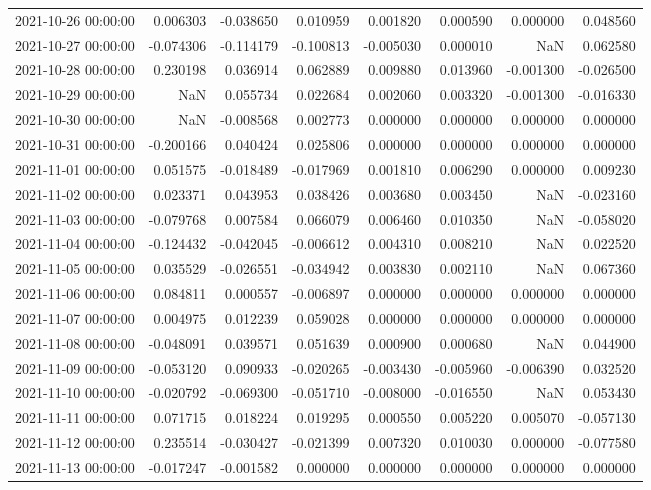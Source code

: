 \begin{tabular}{lrrrrrrr}
2021-10-26 00:00:00 & 0.006303 & -0.038650 & 0.010959 & 0.001820 & 0.000590 & 0.000000 & 0.048560 \\
2021-10-27 00:00:00 & -0.074306 & -0.114179 & -0.100813 & -0.005030 & 0.000010 & NaN & 0.062580 \\
2021-10-28 00:00:00 & 0.230198 & 0.036914 & 0.062889 & 0.009880 & 0.013960 & -0.001300 & -0.026500 \\
2021-10-29 00:00:00 & NaN & 0.055734 & 0.022684 & 0.002060 & 0.003320 & -0.001300 & -0.016330 \\
2021-10-30 00:00:00 & NaN & -0.008568 & 0.002773 & 0.000000 & 0.000000 & 0.000000 & 0.000000 \\
2021-10-31 00:00:00 & -0.200166 & 0.040424 & 0.025806 & 0.000000 & 0.000000 & 0.000000 & 0.000000 \\
2021-11-01 00:00:00 & 0.051575 & -0.018489 & -0.017969 & 0.001810 & 0.006290 & 0.000000 & 0.009230 \\
2021-11-02 00:00:00 & 0.023371 & 0.043953 & 0.038426 & 0.003680 & 0.003450 & NaN & -0.023160 \\
2021-11-03 00:00:00 & -0.079768 & 0.007584 & 0.066079 & 0.006460 & 0.010350 & NaN & -0.058020 \\
2021-11-04 00:00:00 & -0.124432 & -0.042045 & -0.006612 & 0.004310 & 0.008210 & NaN & 0.022520 \\
2021-11-05 00:00:00 & 0.035529 & -0.026551 & -0.034942 & 0.003830 & 0.002110 & NaN & 0.067360 \\
2021-11-06 00:00:00 & 0.084811 & 0.000557 & -0.006897 & 0.000000 & 0.000000 & 0.000000 & 0.000000 \\
2021-11-07 00:00:00 & 0.004975 & 0.012239 & 0.059028 & 0.000000 & 0.000000 & 0.000000 & 0.000000 \\
2021-11-08 00:00:00 & -0.048091 & 0.039571 & 0.051639 & 0.000900 & 0.000680 & NaN & 0.044900 \\
2021-11-09 00:00:00 & -0.053120 & 0.090933 & -0.020265 & -0.003430 & -0.005960 & -0.006390 & 0.032520 \\
2021-11-10 00:00:00 & -0.020792 & -0.069300 & -0.051710 & -0.008000 & -0.016550 & NaN & 0.053430 \\
2021-11-11 00:00:00 & 0.071715 & 0.018224 & 0.019295 & 0.000550 & 0.005220 & 0.005070 & -0.057130 \\
2021-11-12 00:00:00 & 0.235514 & -0.030427 & -0.021399 & 0.007320 & 0.010030 & 0.000000 & -0.077580 \\
2021-11-13 00:00:00 & -0.017247 & -0.001582 & 0.000000 & 0.000000 & 0.000000 & 0.000000 & 0.000000 \\

\end{tabular}
